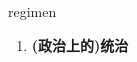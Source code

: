
\begin{frame}
{\huge regimen}
\begin{center}
\begin{enumerate}\Large
  \item \textbf{(政治上的)统治}
\end{enumerate}
\end{center}
\end{frame}
